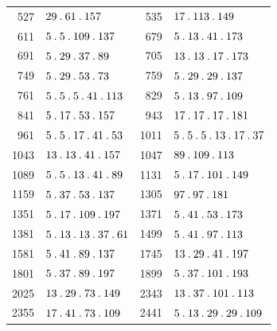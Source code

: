 \begin{longtable}{@{}r|l@{\qquad}r|l@{}}
527 & $29\mathbin{.} 61\mathbin{.} 157$ & 535 & $17\mathbin{.} 113\mathbin{.} 149$\\
611 & $5\mathbin{.} 5\mathbin{.} 109\mathbin{.} 137$ & 679 & $5\mathbin{.} 13\mathbin{.} 41\mathbin{.} 173$\\
691 & $5\mathbin{.} 29\mathbin{.} 37\mathbin{.} 89$ & 705 & $13\mathbin{.} 13\mathbin{.} 17\mathbin{.} 173$\\
749 & $5\mathbin{.} 29\mathbin{.} 53\mathbin{.} 73$ & 759 & $5\mathbin{.} 29\mathbin{.} 29\mathbin{.} 137$\\
761 & $5\mathbin{.} 5\mathbin{.} 5\mathbin{.} 41\mathbin{.} 113$ & 829 & $5\mathbin{.} 13\mathbin{.} 97\mathbin{.} 109$\\
841 & $5\mathbin{.} 17\mathbin{.} 53\mathbin{.} 157$ & 943 & $17\mathbin{.} 17\mathbin{.} 17\mathbin{.} 181$\\
961 & $5\mathbin{.} 5\mathbin{.} 17\mathbin{.} 41\mathbin{.} 53$ & 1011 & $5\mathbin{.} 5\mathbin{.} 5\mathbin{.} 13\mathbin{.} 17\mathbin{.} 37$\\
1043 & $13\mathbin{.} 13\mathbin{.} 41\mathbin{.} 157$ & 1047 & $89\mathbin{.} 109\mathbin{.} 113$\\
1089 & $5\mathbin{.} 5\mathbin{.} 13\mathbin{.} 41\mathbin{.} 89$ & 1131 & $5\mathbin{.} 17\mathbin{.} 101\mathbin{.} 149$\\
1159 & $5\mathbin{.} 37\mathbin{.} 53\mathbin{.} 137$ & 1305 & $97\mathbin{.} 97\mathbin{.} 181$\\
1351 & $5\mathbin{.} 17\mathbin{.} 109\mathbin{.} 197$ & 1371 & $5\mathbin{.} 41\mathbin{.} 53\mathbin{.} 173$\\
1381 & $5\mathbin{.} 13\mathbin{.} 13\mathbin{.} 37\mathbin{.} 61$ & 1499 & $5\mathbin{.} 41\mathbin{.} 97\mathbin{.} 113$\\
1581 & $5\mathbin{.} 41\mathbin{.} 89\mathbin{.} 137$ & 1745 & $13\mathbin{.} 29\mathbin{.} 41\mathbin{.} 197$\\
1801 & $5\mathbin{.} 37\mathbin{.} 89\mathbin{.} 197$ & 1899 & $5\mathbin{.} 37\mathbin{.} 101\mathbin{.} 193$\\
2025 & $13\mathbin{.} 29\mathbin{.} 73\mathbin{.} 149$ & 2343 & $13\mathbin{.} 37\mathbin{.} 101\mathbin{.} 113$\\
2355 & $17\mathbin{.} 41\mathbin{.} 73\mathbin{.} 109$ & 2441 & $5\mathbin{.} 13\mathbin{.} 29\mathbin{.} 29\mathbin{.} 109$\\
\end{longtable}\endgroup
